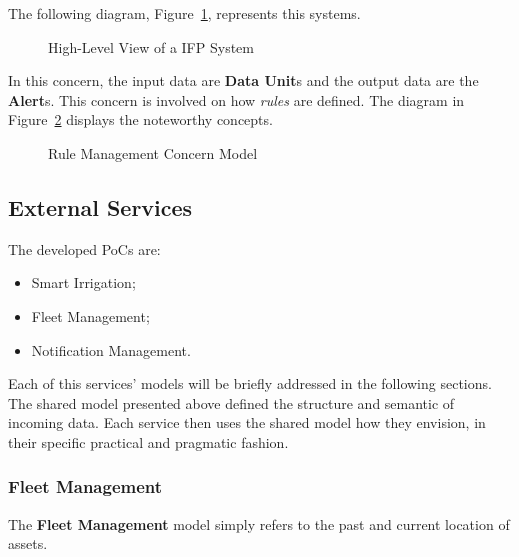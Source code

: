 The following diagram, Figure~\ref{fig:design:domain:bounded_contexts:rule:ifp}, represents this systems.

\begin{figure}[H]
   \centering
  \resizebox{\columnwidth}{!}
  {
     
  }
  \caption[High-Level View of a \gls{IFP} System]{High-Level View of a \gls{IFP} System}
  \label{fig:design:domain:bounded_contexts:rule:ifp}
\end{figure}

In this concern, the input data are \textbf{Data Unit}s and the output data are the \textbf{Alert}s. This concern is involved on how \textit{rules} are defined. The diagram in Figure~\ref{fig:design:domain:bounded_contexts:rule:diagram} displays the noteworthy concepts.

\begin{figure}[H]
   \centering
  \resizebox{\columnwidth}{!}
  {
     
  }
  \caption[Rule Management Concern Model]{Rule Management Concern Model}
  \label{fig:design:domain:bounded_contexts:rule:diagram}
\end{figure}

\subsection{External Services}
\label{subsec:design:domain:services_contexts}

The developed \gls{PoC}s are:

\begin{itemize}
      \item Smart Irrigation;
      \item Fleet Management;
      \item Notification Management.
\end{itemize}

Each of this services' models will be briefly addressed in the following sections. The shared model presented above defined the structure and semantic of incoming data. Each service then uses the shared model how they envision, in their specific practical and pragmatic fashion.

\subsubsection{Fleet Management}
\label{subsubsec:design:domain:bounded_contexts:fleet}

The \textbf{Fleet Management} model simply refers to the past and current location of assets.

